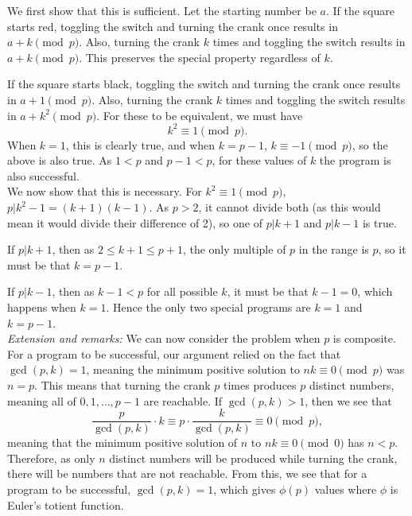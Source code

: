 \documentclass{article}
\begin{document}
     We first show that this is sufficient. Let the starting number be $a$. If the square starts red, toggling the switch and turning the crank once results in $a + k \pmod p$. Also, turning the crank $k$ times and toggling the switch results in $a + k \pmod p$. This preserves the special property regardless of $k$. 
     
     If the square starts black, toggling the switch and turning the crank once results in $a + 1\pmod p$. Also, turning the crank $k$ times and toggling the switch results in $a + k^2 \pmod p$. For these to be equivalent, we must have
     $$k^2 \equiv 1 \pmod p.$$
     When $k = 1$, this is clearly true, and when $k = p - 1$, $k \equiv -1 \pmod p$, so the above is also true. As $1 < p$ and $p - 1 < p$, for these values of $k$ the program is also successful.\\

     We now show that this is necessary. For $k^2\equiv 1 \pmod p$, $p | k^2 - 1 = (k + 1)(k - 1)$. As $p > 2$, it cannot divide both (as this would mean it would divide their difference of 2), so one of $p | k + 1$ and $p | k - 1$ is true. 
     
     If $p|k + 1$, then as $2\leq k + 1 \leq p + 1$, the only multiple of $p$ in the range is $p$, so it must be that $k = p - 1$.

     If $p | k - 1$, then as $k - 1 < p$ for all possible $k$, it must be that $k - 1 = 0$, which happens when $k = 1$. Hence the only two special programs are $k = 1$ and $k = p - 1$. \\

     \textit{Extension and remarks:} We can now consider the problem when $p$ is composite. For a program to be successful, our argument relied on the fact that $\gcd(p, k) = 1$, meaning the minimum positive solution to $nk\equiv 0 \pmod p$ was $n = p$. This means that turning the crank $p$ times produces $p$ distinct numbers, meaning all of $0, 1, \dots, p - 1$ are reachable. If $\gcd(p, k) > 1$, then we see that $$\frac{p}{\gcd(p, k)} \cdot k \equiv p \cdot \frac{k}{\gcd(p, k)} \equiv 0 \pmod p,$$
     meaning that the minimum positive solution of $n$ to $nk\equiv 0 \pmod 0$ has $n < p$. Therefore, as only $n$ distinct numbers will be produced while turning the crank, there will be numbers that are not reachable. From this, we see that for a program to be successful, $\gcd(p, k) = 1$, which gives $\phi(p)$ values where $\phi$ is Euler's totient function.\\
\end{document}
